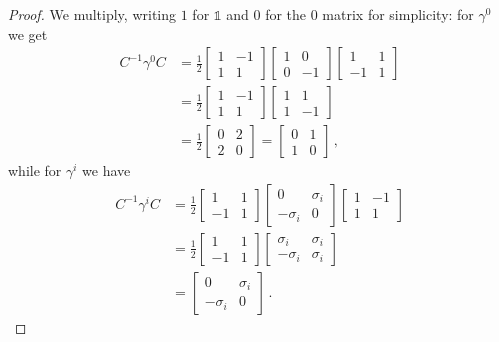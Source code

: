 \documentclass[main.tex]{subfiles}
\begin{document}
\begin{proof}
We multiply, writing \(1\) for \(\mathbb{1}\) and \(0\) for the 0 matrix for simplicity: for \(\gamma^{0}\) we get 
%
\begin{align}
C^{-1} \gamma^{0} C &= \frac{1}{2} \left[\begin{array}{cc}
1 & -1 \\ 
1 & 1
\end{array}\right]
\left[\begin{array}{cc}
1 & 0 \\ 
0 & -1
\end{array}\right]
\left[\begin{array}{cc}
1 & 1 \\ 
-1 & 1
\end{array}\right]  \\
&= \frac{1}{2} \left[\begin{array}{cc}
1 & -1 \\ 
1 & 1
\end{array}\right] 
\left[\begin{array}{cc}
1 & 1 \\ 
1 & -1
\end{array}\right]  \\
&= \frac{1}{2} \left[\begin{array}{cc}
0 & 2 \\ 
2 & 0
\end{array}\right] = \left[\begin{array}{cc}
0 & 1 \\ 
1 & 0
\end{array}\right]
\,,
\end{align}
%
while for \(\gamma^{i}\) we have 
%
\begin{align}
C^{-1} \gamma^{i} C &= \frac{1}{2} \left[\begin{array}{cc}
1 & 1 \\ 
-1 & 1
\end{array}\right]
\left[\begin{array}{cc}
0 & \sigma_{i} \\ 
- \sigma_{i} & 0
\end{array}\right] 
\left[\begin{array}{cc}
1 & -1 \\ 
1 & 1
\end{array}\right]  \\
&= \frac{1}{2} 
\left[\begin{array}{cc}
1 & 1 \\ 
-1 & 1
\end{array}\right]
\left[\begin{array}{cc}
\sigma_i  & \sigma_i  \\ 
- \sigma_i  & \sigma_i 
\end{array}\right]  \\
&= \left[\begin{array}{cc}
0 & \sigma_i  \\ 
-\sigma_i  & 0
\end{array}\right]
\,.
\end{align}
\end{proof}
\end{document}
